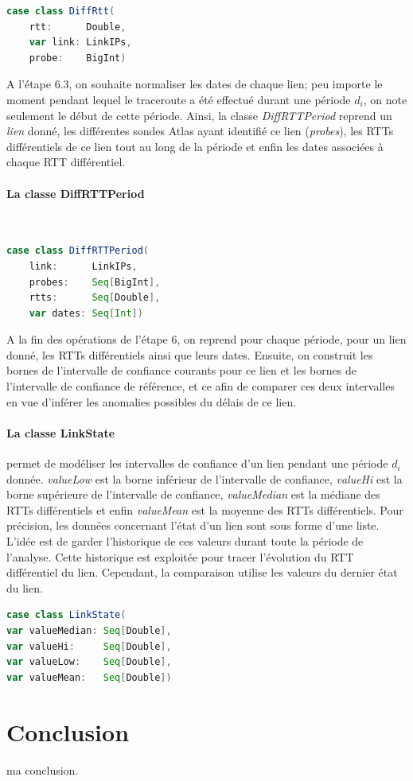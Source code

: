 \begin{lstlisting}[language=scala, caption={La classe DiffRtt en Scala }]
case class DiffRtt(
	rtt:      Double,
	var link: LinkIPs,
	probe:    BigInt)
\end{lstlisting}

A l'étape 6.3, on souhaite normaliser les dates de chaque lien; peu importe le moment pendant lequel le traceroute a été effectué durant une période $d_i$, on note seulement le début de cette période. Ainsi,  la classe  \textit{DiffRTTPeriod}  reprend un \textit{lien} donné, les différentes sondes Atlas ayant identifié ce lien (\textit{probes}), les RTTs différentiels de ce lien tout au long de la période et enfin les dates associées à chaque RTT différentiel.
\paragraph{La classe DiffRTTPeriod } ~
\begin{lstlisting}[language=scala, caption={La classe DiffRTTPeriod en Scala }]
case class DiffRTTPeriod(
	link:      LinkIPs,
	probes:    Seq[BigInt],
	rtts:      Seq[Double],
	var dates: Seq[Int])
\end{lstlisting}

A la fin des opérations de l'étape 6, on reprend pour chaque période, pour un lien donné, les RTTs différentiels ainsi que leurs dates. Ensuite, on construit les bornes de l'intervalle de confiance courants pour ce lien et les bornes de l'intervalle de confiance de référence, et ce afin de comparer ces deux intervalles en vue d'inférer les anomalies possibles du délais de ce lien.


\paragraph{La classe LinkState } permet de modéliser les intervalles de confiance d'un lien pendant une période $d_i$ donnée. \textit{valueLow} est la borne inférieur de l'intervalle de confiance, \textit{valueHi} est la borne supérieure de l'intervalle de confiance, \textit{valueMedian} est la médiane des RTTs différentiels et enfin \textit{valueMean} est la moyenne des RTTs différentiels. Pour précision, les données concernant l'état d'un lien sont sous forme d'une liste. L'idée est de garder l'historique de ces valeurs durant toute la période de l'analyse. Cette historique est exploitée pour tracer l'évolution du RTT différentiel du lien. Cependant, la comparaison utilise les valeurs du dernier état du lien.

  

\begin{lstlisting}[language=scala, caption={La classe LinkState en Scala }]
case class LinkState(
var valueMedian: Seq[Double],
var valueHi:     Seq[Double],
var valueLow:    Seq[Double],
var valueMean:   Seq[Double])
\end{lstlisting}


\section{Conclusion}
ma conclusion.